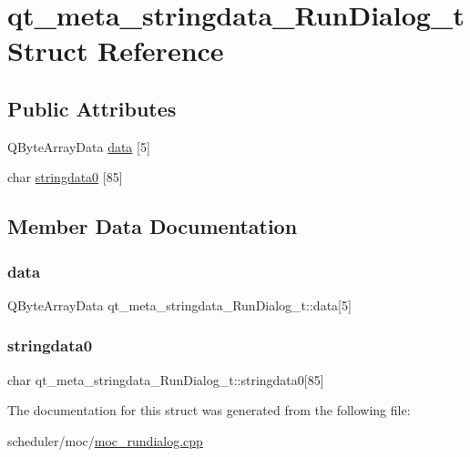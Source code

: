 \hypertarget{structqt__meta__stringdata___run_dialog__t}{}\section{qt\+\_\+meta\+\_\+stringdata\+\_\+\+Run\+Dialog\+\_\+t Struct Reference}
\label{structqt__meta__stringdata___run_dialog__t}
\subsection*{Public Attributes}
\begin{DoxyCompactItemize}
\item 
Q\+Byte\+Array\+Data \mbox{\hyperlink{structqt__meta__stringdata___run_dialog__t_a129c9a1da5cc3046dccac9df27f0c663}{data}} \mbox{[}5\mbox{]}
\item 
char \mbox{\hyperlink{structqt__meta__stringdata___run_dialog__t_ad83575994cfbbb6a17a5946074a78c7d}{stringdata0}} \mbox{[}85\mbox{]}
\end{DoxyCompactItemize}


\subsection{Member Data Documentation}
\mbox{\label{structqt__meta__stringdata___run_dialog__t_a129c9a1da5cc3046dccac9df27f0c663}} 
\subsubsection{\texorpdfstring{data}{data}}
{\footnotesize\ttfamily Q\+Byte\+Array\+Data qt\+\_\+meta\+\_\+stringdata\+\_\+\+Run\+Dialog\+\_\+t\+::data\mbox{[}5\mbox{]}}

\mbox{\label{structqt__meta__stringdata___run_dialog__t_ad83575994cfbbb6a17a5946074a78c7d}} 
\subsubsection{\texorpdfstring{stringdata0}{stringdata0}}
{\footnotesize\ttfamily char qt\+\_\+meta\+\_\+stringdata\+\_\+\+Run\+Dialog\+\_\+t\+::stringdata0\mbox{[}85\mbox{]}}



The documentation for this struct was generated from the following file\+:\begin{DoxyCompactItemize}
\item 
scheduler/moc/\mbox{\hyperlink{moc__rundialog_8cpp}{moc\+\_\+rundialog.\+cpp}}\end{DoxyCompactItemize}
